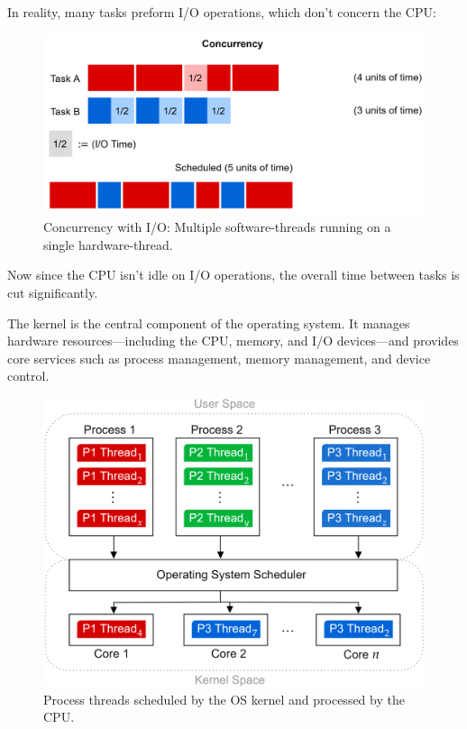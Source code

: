 \noindent
In reality, many tasks preform I/O operations, which don't 
concern the CPU:
\begin{figure}[h]
    \centering
    \includegraphics[width=.75\textwidth]{./Sections/high/concurrency_io.png}
    \caption{Concurrency with I/O: Multiple software-threads running on a single hardware-thread.}
\end{figure}

\noindent
Now since the CPU isn't idle on I/O operations, the overall time between tasks is cut significantly.

\newpage

\begin{Def}[Kernel]
    
    The kernel is the central component of the operating system. It manages hardware resources—including the CPU, memory, and I/O devices—and provides core services such as process management, memory management, and device control.
\end{Def}

\begin{figure}[h]
    \centering
    \includegraphics[width=.8\textwidth]{./Sections/high/user_kernel.png}
    \caption{Process threads scheduled by the OS kernel and processed by the CPU.}
    \label{fig:kernel}
\end{figure}


